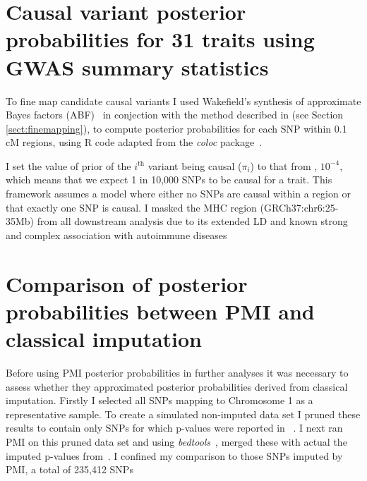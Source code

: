 \documentclass[a4paper,11pt]{report}
\begin{document}
\section{Causal variant posterior probabilities for 31 traits using GWAS summary statistics}
To fine map candidate causal variants I used Wakefield's synthesis of approximate Bayes factors (ABF)~\citep{Wakefield2009} in conjection with the method described in \citet{The_Wellcome_Trust_Case_Control_Consortium2012-ad} (see Section \ref{sect:finemapping}), to compute posterior probabilities for each SNP within 0.1 cM regions, using R code adapted from the \textit{coloc} package~\citep{GiambartolomeiVukcevicSchadtEtAl2014}.  

I set the value of prior of the $i^\text{th}$ variant being causal ($\pi_{i}$) to that from \citet{GiambartolomeiVukcevicSchadtEtAl2014}, $10^{-4}$, which means that we expect 1 in 10,000 SNPs to be causal for a trait. This framework assumes a model where either no SNPs are causal within a region or that exactly one SNP is causal. I masked the MHC region (GRCh37:chr6:25-35Mb) from all downstream analysis due to its extended LD and known strong and complex association with autoimmune diseases

\section{Comparison of posterior probabilities between PMI and classical imputation}
Before using PMI posterior probabilities in further analyses it was necessary to assess whether they approximated posterior probabilities derived from classical imputation. Firstly I selected all SNPs mapping to Chromosome 1 as a representative sample. To create a simulated non-imputed data set I pruned these results to contain only SNPs for which p-values were reported in ~\citet{Stahl2010-wz}. I next ran PMI on this pruned data set and using \textit{bedtools}~\citep{Quinlan2014}, merged these with actual the imputed p-values from~\citet{Okada2014-um}. I confined my comparison to those SNPs imputed by PMI, a total of 235,412 SNPs

\

\end{document}
